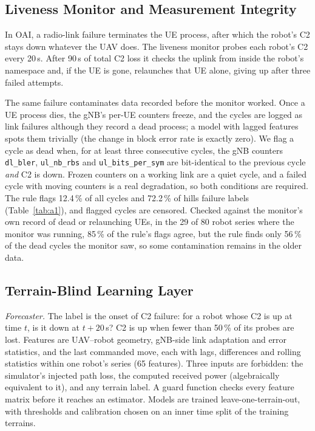 \subsection{Liveness Monitor and Measurement Integrity}
\label{sec:dead}
In OAI, a radio-link failure terminates the UE process, after which the
robot's C2 stays down whatever the UAV does. The liveness monitor probes each
robot's C2 every 20\,s. After 90\,s of total C2 loss it checks the uplink from
inside the robot's namespace and, if the UE is gone, relaunches that UE alone,
giving up after three failed attempts.

The same failure contaminates data recorded before the monitor worked. Once a
UE process dies, the gNB's per-UE counters freeze, and the cycles are logged as
link failures although they record a dead process; a model with lagged
features spots them trivially (the change in block error rate is exactly zero).
We flag a cycle as dead when, for at least three consecutive cycles, the gNB
counters \texttt{dl\_bler}, \texttt{ul\_nb\_rbs} and \texttt{ul\_bits\_per\_sym}
are bit-identical to the previous cycle \emph{and} C2 is down. Frozen counters
on a working link are a quiet cycle, and a failed cycle with moving counters is
a real degradation, so both conditions are required. The rule flags 12.4\,\%
of all cycles and 72.2\,\% of hills failure labels (Table~\ref{tab:a1}), and
flagged cycles are censored. Checked against the monitor's own record of dead or
relaunching UEs, in the 29 of 80 robot series where the monitor was running,
85\,\% of the rule's flags agree, but the rule finds only 56\,\% of the dead
cycles the monitor saw, so some contamination remains in the older data.

\subsection{Terrain-Blind Learning Layer}
\label{sec:layer}
\textit{Forecaster.} The label is the onset of C2 failure: for a robot whose C2
is up at time $t$, is it down at $t+20$\,s? C2 is up when fewer than 50\,\% of
its probes are lost. Features are UAV--robot geometry, gNB-side link
adaptation and error statistics, and the last commanded move, each with lags,
differences and rolling statistics within one robot's series (65 features).
Three inputs are forbidden: the simulator's injected path loss, the computed
received power (algebraically equivalent to it), and any terrain label. A guard
function checks every feature matrix before it reaches an estimator. Models are
trained leave-one-terrain-out, with thresholds and calibration chosen on an
inner time split of the training terrains.

